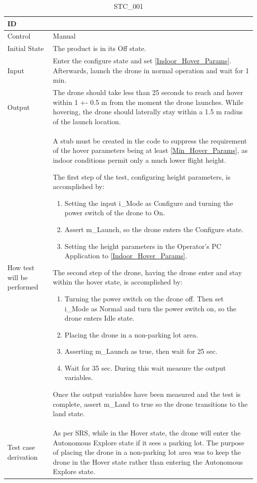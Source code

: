 \documentclass[12pt, titlepage]{article}
\begin{document}
\begin{table}[!h]
\begin{center}
\caption {STC\_001}
\label{tab:STC_001}
\begin{tabular}{ | m{1.5cm} | m{15cm} | } 
\hline
ID & \nameref{tab:STC_001} \\ 
\hline
Control & Manual \\ 
\hline
Initial State & The product is in its Off state. \\ 
\hline
Input & Enter the configure state and set \ref{Indoor_Hover_Params}. Afterwards, launch the drone in normal operation and wait for 1 min. \\ 
\hline
Output & The drone should take less than 25 seconds to reach and hover within 1 +- 0.5 m from the moment the drone launches. While hovering, the drone should laterally stay within a 1.5 m radius of the launch location. \\ 
\hline
How test will be performed & A stub must be created in the code to suppress the requirement of the hover parameters being at least \ref{Min_Hover_Params}, as indoor conditions permit only a much lower flight height. 

The first step of the test, configuring height parameters, is accomplished by:
\begin{enumerate}[topsep=0pt,itemsep=-1ex,partopsep=1ex,parsep=1ex]
    \item Setting the input i\_Mode as Configure and turning the power switch of the drone to On.
    \item Assert m\_Launch, so the drone enters the Configure state.
    \item Setting the height parameters in the Operator's PC Application to \ref{Indoor_Hover_Params}.
\end{enumerate}
The second step of the drone, having the drone enter and stay within the hover state, is accomplished by:
\begin{enumerate}[topsep=0pt,itemsep=-1ex,partopsep=1ex,parsep=1ex]
	\item Turning the power switch on the drone off. Then set i\_Mode as Normal and turn the power switch on, so the drone enters Idle state.
	\item Placing the drone in a non-parking lot area. 
	\item Asserting m\_Launch as true, then wait for 25 sec.
	\item Wait for 35 sec. During this wait measure the output variables.
\end{enumerate}
Once the output variables have been measured and the test is complete, assert m_Land to true so the drone transitions to the land state.\\ 
\hline
Test case derivation & As per SRS, while in the Hover state, the drone will enter the Autonomous Explore state if it sees a parking lot. The purpose of placing the drone in a non-parking lot area was to keep the drone in the Hover state rather than entering the Autonomous Explore state.


\end{tabular}
\end{center}
\end{table}
\end{document}
